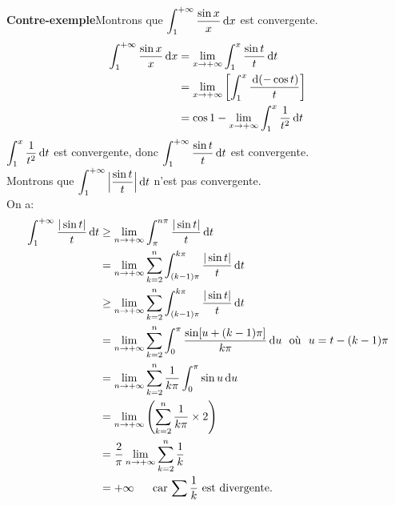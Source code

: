 \documentclass[11pt, a4paper]{book}
\begin{document}
\textbf{Contre-exemple}\quad Montrons que ${\displaystyle \int_1^{+\infty} \dfrac{\sin x}{x}\,\mathrm{d} x}$ est convergente.\\
\begin{align*} \int_1^{+\infty} \dfrac{\sin x}{x}\,\mathrm{d} x &= \lim_{x\rightarrow+\infty} \int_1^{x} \dfrac{\sin t}{t} \,\mathrm{d} t\\ &= \lim_{x\rightarrow+\infty}\left[ \int_1^x \dfrac{\,\mathrm{d}(-\cos t)}{t}\right]\\ &= \cos1-\lim_{x\rightarrow+\infty} \int_1^x \dfrac{1}{t^2}\,\mathrm{d} t
\end{align*}
${\displaystyle \int_1^x \dfrac{1}{t^2}\,\mathrm{d} t}$ est convergente, donc ${\displaystyle \int_1^{+\infty} \dfrac{\sin t}{t}\,\mathrm{d} t}$ est convergente.\\
Montrons que ${\displaystyle \int_1^{+\infty}\Big|\dfrac{\sin t}{t}\Big|\,\mathrm{d} t}$ n'est pas convergente.\\
On a: 
\begin{align*} \int_1^{+\infty} \dfrac{|\sin t|}{t}\,\mathrm{d} t &\geq \lim_{n\rightarrow+\infty} \int_\pi ^{n\pi} \dfrac{|\sin t|}{t}\,\mathrm{d} t\\&=\lim_{n\rightarrow+\infty} \sum_{k=2}^n \int_{(k-1)\pi}^{k\pi} \dfrac{|\sin t|}{t}\,\mathrm{d} t \\ &\geq \lim_{n\rightarrow+\infty} \sum_{k=2}^n \int_{(k-1)\pi}^{k\pi} \dfrac{|\sin t|}{t}\,\mathrm{d} t\\&=\lim_{n\rightarrow+\infty} \sum_{k=2}^n \int_0^\pi \dfrac{\sin [u+(k-1)\pi]}{k\pi}\,\mathrm{d} u ~~\text{o\`u} ~~ u=t-(k-1)\pi\\ &=\lim_{n\rightarrow+\infty} \sum_{k=2}^n \dfrac{1}{k\pi}\int_0^\pi \sin u \,\mathrm{d} u \\&= \lim_{n\rightarrow+\infty}\left(\sum_{k=2}^n \dfrac{1}{k\pi}\times 2\right)\\ &= \dfrac{2}{\pi}\lim_{n\rightarrow+\infty} \sum_{k=2}^n \dfrac{1}{k}\\
&=+\infty \quad~~\text{car $\sum \dfrac{1}{k}$ est divergente.}
\end{align*} 
\end{document}
